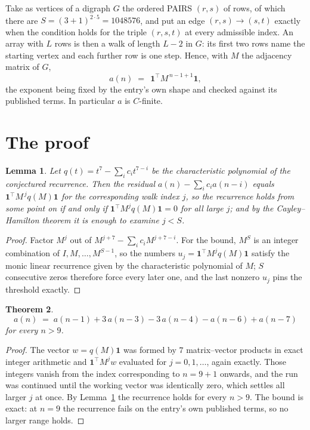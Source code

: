 \documentclass[11pt,a4paper]{article}
\theoremstyle{plain}
\newtheorem{theorem}{Theorem}
\newtheorem{lemma}[theorem]{Lemma}
\theoremstyle{definition}
\begin{document}
Take as vertices of a digraph $G$ the ordered PAIRS $(r,s)$ of rows, of which there are
$S=(3+1)^{2\cdot5}=1048576$, and put an edge $(r,s)\to(s,t)$ exactly when the condition
holds for the triple $(r,s,t)$ at every admissible index. An array with $L$ rows is then a
walk of length $L-2$ in $G$: its first two rows name the starting vertex and each further
row is one step. Hence, with $M$ the adjacency matrix of $G$,
\[
a(n)\;=\;\,\mathbf{1}^{\!\top}M^{\,n-1+1}\mathbf{1},
\]
the exponent being fixed by the entry's own shape and checked against its published terms.
In particular $a$ is $C$-finite.

\section{The proof}

\begin{lemma}\label{lem:crit}
Let $q(t)=t^{7}-\sum_i c_it^{7-i}$ be the characteristic polynomial of the
conjectured recurrence. Then the residual $a(n)-\sum_ic_ia(n-i)$ equals
$\mathbf{1}^{\!\top}M^{\,j}q(M)\mathbf{1}$ for the corresponding walk index
$j$, so the recurrence holds from some point on if and only if
$\mathbf{1}^{\!\top}M^{j}q(M)\mathbf{1}=0$ for all large $j$; and by the
Cayley--Hamilton theorem it is enough to examine $j<S$.
\end{lemma}

\begin{proof}
Factor $M^{j}$ out of $M^{j+7}-\sum_ic_iM^{j+7-i}$. For the bound, $M^{S}$
is an integer combination of $I,M,\dots,M^{S-1}$, so the numbers
$u_j=\mathbf{1}^{\!\top}M^{j}q(M)\mathbf{1}$ satisfy the monic linear recurrence given by
the characteristic polynomial of $M$; $S$ consecutive zeros therefore force every later one,
and the last nonzero $u_j$ pins the threshold exactly.
\end{proof}

\begin{theorem}
\[
a(n)\;=\;a(n-1) + 3\,a(n-3) - 3\,a(n-4) - a(n-6) + a(n-7)
\]
for every $n>9$.
\end{theorem}

\begin{proof}
The vector $w=q(M)\mathbf{1}$ was formed by $7$ matrix--vector products in exact
integer arithmetic and $\mathbf{1}^{\!\top}M^{j}w$ evaluated for $j=0,1,\dots$, again
exactly. Those integers vanish from the index corresponding to $n=9+1$ onwards, and the
run was continued until the working vector was identically zero, which settles all larger $j$
at once. By Lemma~\ref{lem:crit} the recurrence holds for every $n>9$. The bound is exact: at $n=9$ the recurrence fails on the entry's own published terms, so no larger range holds.
\end{proof}
\end{document}
